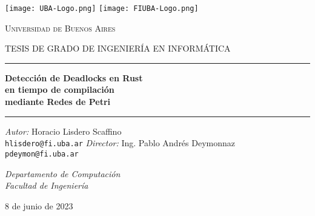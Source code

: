 
\begin{titlepage}
    \centering
    \Large

    \texttt{[image: UBA-Logo.png]}
    \hfill
    \texttt{[image: FIUBA-Logo.png]}

    {\Huge \textsc{Universidad de Buenos Aires} \par}
    {\large \textsc{\uppercase{Tesis de grado de Ingeniería en Informática}}}

    \rule{\linewidth}{0.5mm}
    {\Huge \textbf{Detección de Deadlocks en Rust}
        \\ \textbf{en tiempo de compilación}
        \\ \textbf{mediante Redes de Petri}
        \\
    }
    \rule{\linewidth}{0.5mm}

    \vfill
    \textit{Autor:} Horacio Lisdero Scaffino\\
    {\large \texttt{hlisdero@fi.uba.ar}}
    \vfill
    \textit{Director:} Ing. Pablo Andrés Deymonnaz\\
    {\large \texttt{pdeymon@fi.uba.ar}}

    \vfill
    \textit{Departamento de Computación}\\
    \textit{Facultad de Ingeniería}
    \vfill

    8 de junio de 2023
\end{titlepage}